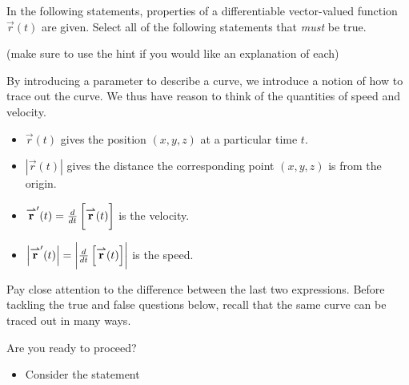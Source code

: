 \documentclass{ximera}
\author{Jim Talamo}
\begin{document}
\begin{exercise}

In the following statements, properties of a differentiable vector-valued function $\vec{r}(t)$ are given.  Select all of the following statements that \emph{must} be true.

\begin{selectAll}
\end{selectAll}

(make sure to use the hint if you would like an explanation of each)

\begin{hint}

By introducing a parameter to describe a curve, we introduce a notion of how to trace out the curve.  We thus have reason to think of the quantities of speed and velocity.

\begin{itemize}
\item $\vec{r}(t)$ gives the position $(x,y,z)$ at a particular time $t$.
\item $|\vec{r}(t)|$ gives the distance the corresponding point $(x,y,z)$ is from the origin.
\item ${\overset{\boldsymbol{\rightharpoonup}}{\mathbf{r}}}'(t) = \frac{\mathop{}\!d}{\mathop{}\!d t} \left[\vphantom{\bigg|} {\overset{\boldsymbol{\rightharpoonup}}{\mathbf{r}}}(t) \right]$ is the velocity.
\item  $\left|{\overset{\boldsymbol{\rightharpoonup}}{\mathbf{r}}}'(t)\right| = \left|\vphantom{\bigg|}  \frac{\mathop{}\!d}{\mathop{}\!d t}\left[{\overset{\boldsymbol{\rightharpoonup}}{\mathbf{r}}}(t) \right]\right|$ is the speed.
\end{itemize}
Pay close attention to the difference between the last two expressions.  Before tackling the true and false questions below, recall that the same curve can be traced out in many ways.  

\begin{question}
Are you ready to proceed?

\begin{multipleChoice}
\end{multipleChoice}

\begin{question}
\begin{itemize}
\item Consider the statement


\end{itemize}
\end{question}
\end{question}
\end{hint}
\end{exercise}
\end{document}
